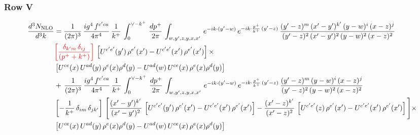 \documentclass[9pt]{article}
\numberwithin{equation}{section}
\newcommand{\chg}[1]{{\color{red}#1}}
\begin{document}
\subsubsection{Row V}
\begin{align}
    \frac{d^{3}N_{\rm NLO}}{d^{3}k} & =  \frac{1}{(2\pi)^{3}}\, \frac{ig^{4}\,f^{c'ca}}{4\pi^{4}}\, \frac{1}{k^{+}}\,\int_{0}^{\vee-k^{+}}\, \frac{dp^{+}}{2\pi}\, \int_{w,y',z,y,x,x'}\, e^{-ik\cdot (y'-w)}\, e^{-ik\cdot \frac{p^{+}}{k^{+}}\,(y'-z)}\,\frac{(y'-z)^{m}\,(x'-y')^{k'}\,(y-w)^{i}\,(x-z)^{j}}{(y'-z)^{2}\,(x'-y')^{2}\,(y-w)^{2}\,(x-z)^{2}}\notag \\ & \chg{\left[\frac{\delta_{k'm}\,\delta_{ij}}{(p^{+}+k^{+})}\right]}\, \left[U^{c'e'}(y')\,\rho^{e'}(x')-U^{c'e'}(x')\,\rho^{e'}(x')\right]\times \notag \\ &  \left[U^{ce}(x)\,U^{ad}(y)\,\rho^{e}(x)\rho^{d}(y)-U^{ad}(w)\,U^{ce}(x)\,\rho^{e}(x)\rho^{d}(y)\right] \notag \\
&   +\,\frac{1}{(2\pi)^{3}}\, \frac{ig^{4}\,f^{c'ca}}{4\pi^{4}}\, \frac{1}{k^{+}}\,\int_{0}^{\vee-k^{+}}\, \frac{dp^{+}}{2\pi}\, \int_{w,y',z,y,x,x'}\, e^{-ik\cdot (y'-w)}\, e^{-ik\cdot \frac{p^{+}}{k^{+}}\,(y'-z)}\,\frac{(y'-z)^{m}\,(y-w)^{i}\,(x-z)^{j}}{(y'-z)^{2}\,(y-w)^{2}\,(x-z)^{2}}\notag \\ &   \left[-\frac{1}{k^{+}}\, \delta_{im}\, \delta_{jk'}\right]\, \Bigg[\frac{(x'-y')^{k'}}{(x'-y')^{2}}\,\left[U^{c'e'}(y')\,\rho^{e'}(x')-U^{c'e'}(x')\,\rho^{e'}(x')\right] -\frac{(x'-z)^{k'}}{(x'-z)^{2}}\,\left[U^{c'e'}(z)\,\rho^{e'}(x')-U^{c'e'}(x')\,\rho^{e'}(x')\right]\Bigg]\times\notag \\ &      \left[U^{ce}(x)\,U^{ad}(y)\,\rho^{e}(x)\rho^{d}(y)-U^{ad}(w)\,U^{ce}(x)\,\rho^{e}(x)\rho^{d}(y)\right] 
\end{align}
\end{document}
